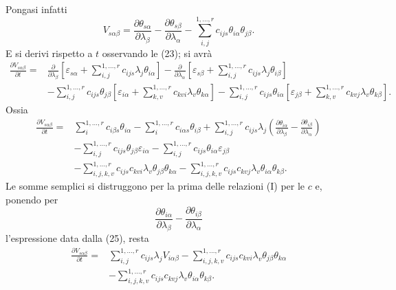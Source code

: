 \documentclass[11pt]{book}
\begin{document}
Pongasi infatti
\begin{equation*}\tag{25}
 V_{s\alpha\beta}=\frac{\partial\theta_{s\alpha}}{\partial\lambda_\beta}
 -\frac{\partial\theta_{s\beta}}{\partial\lambda_\alpha}
 -\sum\limits_{i,j}^{1,\ldots,r}c_{ijs}\theta_{i\alpha}\theta_{j\beta}.
\end{equation*}
E si derivi rispetto a $t$ osservando le (23); si avrà
\[
\begin{split}
\frac{\partial V_{s\alpha\beta}}{\partial t}={}&
\frac{\partial}{\partial\lambda_\beta}
 \left[\varepsilon_{s\alpha}+\sum\limits_{i,j}^{1,\ldots,r}c_{ijs}\lambda_j\theta_{i\alpha}\right]
-\frac{\partial}{\partial\lambda_\alpha}
 \left[\varepsilon_{s\beta}+\sum\limits_{i,j}^{1,\ldots,r}c_{ijs}\lambda_j\theta_{i\beta}\right]                 \\
&-\sum\limits_{i,j}^{1,\ldots,r}c_{ijs}\theta_{j\beta}
 \left[\varepsilon_{i\alpha}+\sum\limits_{k,v}^{1,\ldots,r}c_{kvi}\lambda_v\theta_{k\alpha}\right]
-\sum\limits_{i,j}^{1,\ldots,r}c_{ijs}\theta_{i\alpha}
 \left[\varepsilon_{j\beta}+\sum\limits_{k,v}^{1,\ldots,r}c_{kvj}\lambda_v\theta_{k\beta}\right].
\end{split}
\]
Ossia
\[
\begin{split}
\frac{\partial V_{s\alpha\beta}}{\partial t}={}&
 \sum\limits_i^{1,\ldots,r} c_{i\beta s}\theta_{i\alpha}
-\sum\limits_i^{1,\ldots,r} c_{i\alpha s}\theta_{i\beta}
+\sum\limits_{i,j}^{1,\ldots,r}c_{ijs}\lambda_j
 \left(\frac{\partial\theta_{i\alpha}}{\partial\lambda_\beta}
      -\frac{\partial\theta_{i\beta}}{\partial\lambda_\alpha}\right)                         \\
&-\sum\limits_{i,j}^{1,\ldots,r}c_{ijs}\theta_{j\beta}\varepsilon_{i\alpha}
-\sum\limits_{i,j}^{1,\ldots,r}c_{ijs}\theta_{i\alpha}\varepsilon_{j\beta} \\
&-\sum\limits_{i,j,k,v}^{1,\ldots,r}c_{ijs}c_{kvi}\lambda_v\theta_{j\beta}\theta_{k\alpha}
-\sum\limits_{i,j,k,v}^{1,\ldots,r}c_{ijs}c_{kvj}\lambda_v\theta_{i\alpha}\theta_{k\beta}.
\end{split}
\]
Le somme semplici si distruggono per la prima delle relazioni (I) per le $c$ e, ponendo per
\[
 \frac{\partial\theta_{i\alpha}}{\partial\lambda_\beta}
 -\frac{\partial\theta_{i\beta}}{\partial\lambda_\alpha}
\]
l'espressione data dalla (25), resta
\[
\begin{split}
\frac{\partial V_{s\alpha\beta}}{\partial t}={}&
 \sum\limits_{i,j}^{1,\ldots,r}c_{ijs}\lambda_jV_{i\alpha\beta}
-\sum\limits_{i,j,k,v}^{1,\ldots,r}c_{ijs}c_{kvi}\lambda_v\theta_{j\beta}\theta_{k\alpha}  \\
&-\sum\limits_{i,j,k,v}^{1,\ldots,r}c_{ijs}c_{kvj}\lambda_v\theta_{i\alpha}\theta_{k\beta}.
\end{split}
\]
\end{document}

